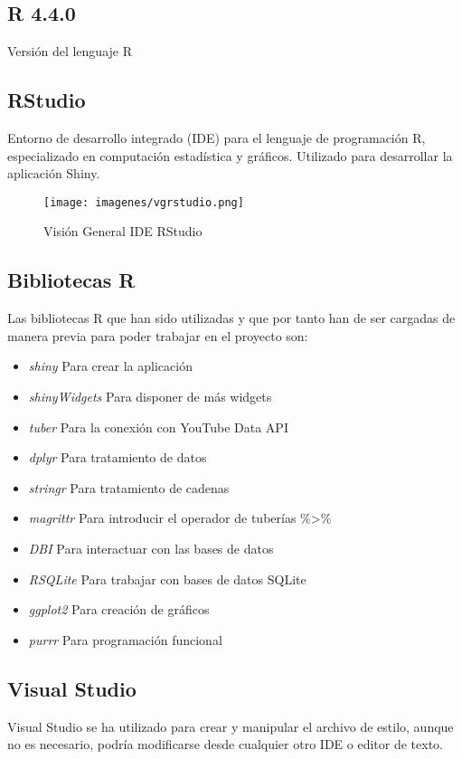 \documentclass[a4paper,12pt,twoside]{memoir}
\begin{document}
\subsection{R 4.4.0} Versión del lenguaje R \cite{R}
\subsection{RStudio} Entorno de desarrollo integrado (IDE) para el lenguaje de programación R, especializado en computación estadística y gráficos. Utilizado para desarrollar la aplicación Shiny. 
 \begin{figure}
    \centering
    \texttt{[image: imagenes/vgrstudio.png]}
    \caption{Visión General IDE RStudio}
    \label{fig:enter-label}
\end{figure}
\subsection{Bibliotecas R}
Las bibliotecas R que han sido utilizadas y que por tanto han de ser cargadas de manera previa para poder trabajar en el proyecto son: 
\begin{itemize}
    \item \textit{shiny} Para crear la aplicación
    \item \textit{shinyWidgets} Para disponer de más widgets
    \item \textit{tuber} Para la conexión con YouTube Data API
    \item \textit{dplyr} Para tratamiento de datos
    \item \textit{stringr} Para tratamiento de cadenas
    \item \textit{magrittr} Para introducir el operador de tuberías \%>\%
    \item \textit{DBI} Para interactuar con las bases de datos
    \item \textit{RSQLite} Para trabajar con bases de datos SQLite
    \item \textit{ggplot2} Para creación de gráficos
    \item \textit{purrr} Para programación funcional
\end{itemize}
\subsection{Visual Studio} Visual Studio se ha utilizado para crear y manipular el archivo de estilo, aunque no es necesario, podría modificarse desde cualquier otro IDE o editor de texto.
\end{document}
